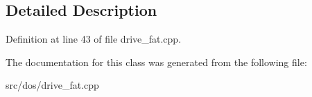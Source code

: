 \subsection{Detailed Description}


Definition at line 43 of file drive\-\_\-fat.\-cpp.



The documentation for this class was generated from the following file\-:\begin{DoxyCompactItemize}
\item 
src/dos/drive\-\_\-fat.\-cpp\end{DoxyCompactItemize}

